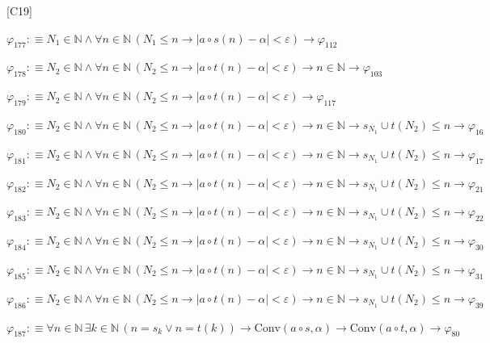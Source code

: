 \begin{fullproof}{[C19]}
\begin{abbrevlist}
\item $\varphi_{177} :\equiv N_{1} \in \mathbb{N} \land \forall n \in \mathbb{N}\,(N_{1} \leq n \to \lvert a \circ s(n) - \alpha \rvert < \varepsilon) \to \varphi_{112}$
\item $\varphi_{178} :\equiv N_{2} \in \mathbb{N} \land \forall n \in \mathbb{N}\,(N_{2} \leq n \to \lvert a \circ t(n) - \alpha \rvert < \varepsilon) \to n \in \mathbb{N} \to \varphi_{103}$
\item $\varphi_{179} :\equiv N_{2} \in \mathbb{N} \land \forall n \in \mathbb{N}\,(N_{2} \leq n \to \lvert a \circ t(n) - \alpha \rvert < \varepsilon) \to \varphi_{117}$
\item $\varphi_{180} :\equiv N_{2} \in \mathbb{N} \land \forall n \in \mathbb{N}\,(N_{2} \leq n \to \lvert a \circ t(n) - \alpha \rvert < \varepsilon) \to n \in \mathbb{N} \to s_{N_{1}} \cup t(N_{2}) \leq n \to \varphi_{16}$
\item $\varphi_{181} :\equiv N_{2} \in \mathbb{N} \land \forall n \in \mathbb{N}\,(N_{2} \leq n \to \lvert a \circ t(n) - \alpha \rvert < \varepsilon) \to n \in \mathbb{N} \to s_{N_{1}} \cup t(N_{2}) \leq n \to \varphi_{17}$
\item $\varphi_{182} :\equiv N_{2} \in \mathbb{N} \land \forall n \in \mathbb{N}\,(N_{2} \leq n \to \lvert a \circ t(n) - \alpha \rvert < \varepsilon) \to n \in \mathbb{N} \to s_{N_{1}} \cup t(N_{2}) \leq n \to \varphi_{21}$
\item $\varphi_{183} :\equiv N_{2} \in \mathbb{N} \land \forall n \in \mathbb{N}\,(N_{2} \leq n \to \lvert a \circ t(n) - \alpha \rvert < \varepsilon) \to n \in \mathbb{N} \to s_{N_{1}} \cup t(N_{2}) \leq n \to \varphi_{22}$
\item $\varphi_{184} :\equiv N_{2} \in \mathbb{N} \land \forall n \in \mathbb{N}\,(N_{2} \leq n \to \lvert a \circ t(n) - \alpha \rvert < \varepsilon) \to n \in \mathbb{N} \to s_{N_{1}} \cup t(N_{2}) \leq n \to \varphi_{30}$
\item $\varphi_{185} :\equiv N_{2} \in \mathbb{N} \land \forall n \in \mathbb{N}\,(N_{2} \leq n \to \lvert a \circ t(n) - \alpha \rvert < \varepsilon) \to n \in \mathbb{N} \to s_{N_{1}} \cup t(N_{2}) \leq n \to \varphi_{31}$
\item $\varphi_{186} :\equiv N_{2} \in \mathbb{N} \land \forall n \in \mathbb{N}\,(N_{2} \leq n \to \lvert a \circ t(n) - \alpha \rvert < \varepsilon) \to n \in \mathbb{N} \to s_{N_{1}} \cup t(N_{2}) \leq n \to \varphi_{39}$
\item $\varphi_{187} :\equiv \forall n \in \mathbb{N}\,\exists k \in \mathbb{N}\,(n = s_{k} \lor n = t(k)) \to \mathrm{Conv}(a \circ s,\alpha) \to \mathrm{Conv}(a \circ t,\alpha) \to \varphi_{80}$

\end{abbrevlist}
\end{fullproof}
